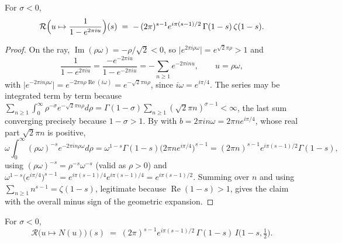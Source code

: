 \begin{lemma}
\label{lem:rsz_ray_zeta}
\leanok
{}
For $\sigma<0$,
\[
  \mathcal{R}\Bigl(u\mapsto\frac1{1-e^{2\pi iu}}\Bigr)(s)
    \;=\;-\,(2\pi)^{s-1}e^{i\pi(s-1)/2}\,\Gamma(1-s)\,\zeta(1-s).
\]
\end{lemma}

\begin{proof}
\leanok
{}
On the ray, $\operatorname{Im}(\rho\omega)=-\rho/\sqrt2<0$, so
$\lvert e^{2\pi i\rho\omega}\rvert=e^{\sqrt2\pi\rho}>1$ and
\[
  \frac1{1-e^{2\pi iu}}=\frac{-e^{-2\pi iu}}{1-e^{-2\pi iu}}
    =-\sum_{n\ge1}e^{-2\pi inu},\qquad u=\rho\omega,
\]
with $\lvert e^{-2\pi in\rho\omega}\rvert=e^{-2\pi n\rho\operatorname{Re}(i\omega)}
=e^{-\sqrt2\pi n\rho}$, since $i\omega=e^{i\pi/4}$.  The series may be integrated term by
term because
$\sum_{n\ge1}\int_{0}^{\infty}\rho^{-\sigma}e^{-\sqrt2\pi n\rho}d\rho
=\Gamma(1-\sigma)\sum_{n\ge1}(\sqrt2\pi n)^{\sigma-1}<\infty$, the last sum converging
precisely because $1-\sigma>1$.  By  with
$b=2\pi in\omega=2\pi ne^{i\pi/4}$, whose real part $\sqrt2\pi n$ is positive,
\[
  \omega\int_{0}^{\infty}(\rho\omega)^{-s}e^{-2\pi in\rho\omega}d\rho
   =\omega^{1-s}\Gamma(1-s)\bigl(2\pi ne^{i\pi/4}\bigr)^{s-1}
   =(2\pi n)^{s-1}e^{i\pi(s-1)/2}\Gamma(1-s),
\]
using $(\rho\omega)^{-s}=\rho^{-s}\omega^{-s}$ (valid as $\rho>0$) and
$\omega^{1-s}\bigl(e^{i\pi/4}\bigr)^{s-1}=e^{i\pi(s-1)/4}e^{i\pi(s-1)/4}=e^{i\pi(s-1)/2}$.
Summing over $n$ and using $\sum_{n\ge1}n^{s-1}=\zeta(1-s)$, legitimate because
$\operatorname{Re}(1-s)>1$, gives the claim with the overall minus sign of the geometric
expansion.
\end{proof}

\begin{lemma}
\label{lem:rsz_ray_contour}
\leanok
{}
For $\sigma<0$,
\[
  \mathcal{R}\bigl(u\mapsto N(u)\bigr)(s)
    \;=\;(2\pi)^{s-1}e^{i\pi(s-1)/2}\,\Gamma(1-s)\,I\bigl(1-s,\tfrac12\bigr).
\]
\end{lemma}

